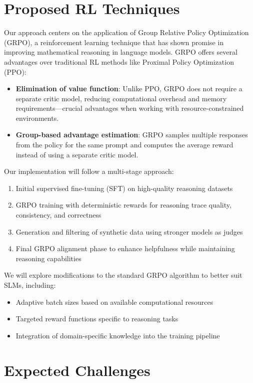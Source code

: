 \documentclass[11pt, oneside]{article}   	%
\begin{document}
\section*{Proposed RL Techniques}

Our approach centers on the application of Group Relative Policy Optimization (GRPO), a reinforcement learning technique that has shown promise in improving mathematical reasoning in language models. GRPO offers several advantages over traditional RL methods like Proximal Policy Optimization (PPO):

\begin{itemize}
	\item \textbf{Elimination of value function}: Unlike PPO, GRPO does not require a separate critic model, reducing computational overhead and memory requirements—crucial advantages when working with resource-constrained environments.

	\item \textbf{Group-based advantage estimation}: GRPO samples multiple responses from the policy for the same prompt and computes the average reward instead of using a separate critic model.
\end{itemize}

Our implementation will follow a multi-stage approach:
\begin{enumerate}
	\item Initial supervised fine-tuning (SFT) on high-quality reasoning datasets
	\item GRPO training with deterministic rewards for reasoning trace quality, consistency, and correctness
	\item Generation and filtering of synthetic data using stronger models as judges
	\item Final GRPO alignment phase to enhance helpfulness while maintaining reasoning capabilities
\end{enumerate}

We will explore modifications to the standard GRPO algorithm to better suit SLMs, including:
\begin{itemize}
	\item Adaptive batch sizes based on available computational resources
	\item Targeted reward functions specific to reasoning tasks
	\item Integration of domain-specific knowledge into the training pipeline
\end{itemize}

\section*{Expected Challenges}
\end{document}
